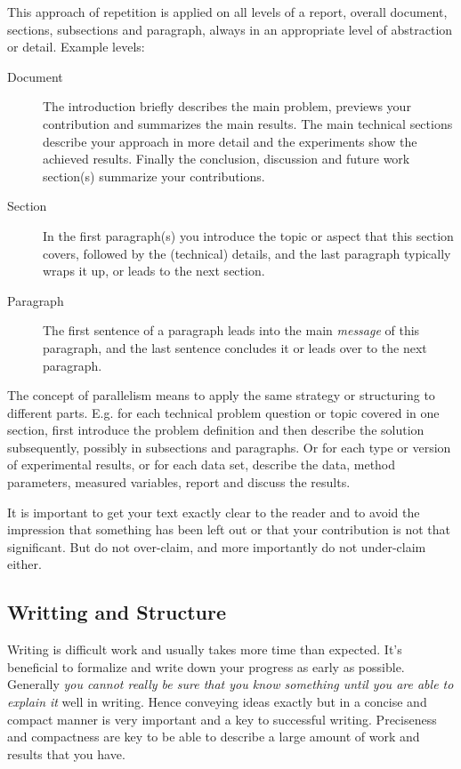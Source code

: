 \documentclass[11pt, a4paper,oneside,chapterprefix=false]{scrbook}
\begin{document}
This approach of repetition is applied on all levels of a report, overall document, sections, subsections and paragraph, always in an appropriate level of abstraction or detail. Example levels:

\begin{description}
\item[Document] The introduction briefly describes the main problem, previews your contribution and summarizes the main results. The main technical sections describe your approach in more detail and the experiments show the achieved results. Finally the conclusion, discussion and future work section(s) summarize your contributions.
\item[Section] In the first paragraph(s) you introduce the topic or aspect that this section covers, followed by the (technical) details, and the last paragraph typically wraps it up, or leads to the next section.
\item[Paragraph] The first sentence of a paragraph leads into the main \emph{message} of this paragraph, and the last sentence concludes it or leads over to the next paragraph.
\end{description}

The concept of parallelism means to apply the same strategy or structuring to different parts. E.g. for each technical problem question or topic covered in one section, first introduce the problem definition and then describe the solution subsequently, possibly in subsections and paragraphs. Or for each type or version of experimental results, or for each data set, describe the data, method parameters, measured variables, report and discuss the results.

It is important to get your text exactly clear to the reader and to avoid the impression that something has been left out or that your contribution is not that significant. But do not over-claim, and more importantly do not under-claim either.

\subsection*{Writting and Structure}

Writing is difficult work and usually takes more time than expected. It's beneficial to formalize and write down your progress as early as possible. Generally \emph{you cannot really be sure that you know something until you are able to explain it} well in writing. Hence conveying ideas exactly but in a concise and compact manner is very important and a key to successful writing. Preciseness and compactness are key to be able to describe a large amount of work and results that you have.
\end{document}

